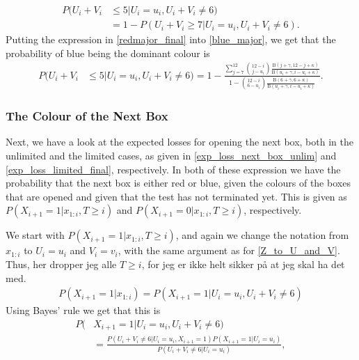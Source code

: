 \begin{equation}
\label{blue_major}
    \begin{aligned}
        P(U_i+V_i& \leq 5 | U_i=u_i,U_i+V_i \neq 6) \\
        &= 1 - P(U_i+V_i \geq 7 | U_i=u_i,U_i+V_i \neq 6).
    \end{aligned}
\end{equation}
Putting the expression in \eqref{redmajor_final} into \eqref{blue_major}, we get that the probability of blue being the dominant colour is
\begin{equation}
\label{blue_major_final}
    \begin{aligned}
        P(U_i+V_i& \leq 5 | U_i=u_i,U_i+V_i \neq 6) 
        = 1 - \frac{\sum_{j=7}^{12} \binom{12-i}{j-u_i} \frac{\text{B}(j+\gamma,12-j+\kappa)}{\text{B}(u_i+\gamma,i-u_i+\kappa)}}{1-\binom{12-i}{6-u_i} \frac{\text{B}(6+\gamma,6+\kappa)}{\text{B}(u_i+\gamma,i-u_i+\kappa)}}.
    \end{aligned}
\end{equation}

\subsubsection{The Colour of the Next Box}
Next, we have a look at the expected losses for opening the next box, both in the unlimited and the limited cases, as given in \eqref{exp_loss_next_box_unlim} and \eqref{exp_loss_limited_final}, respectively. In both of these expression we have the probability that the next box is either red or blue, given the colours of the boxes that are opened and given that the test has not terminated yet. This is given as $P(X_{i+1}=1|x_{1:i},T\geq i)$ and $P(X_{i+1}=0|x_{1:i},T\geq i)$, respectively.

We start with $P(X_{i+1}=1|x_{1:i},T\geq i)$, and again we change the notation from $x_{1:i}$ to $U_i=u_i$ and $V_i=v_i$, with the same argument as for \eqref{Z_to_U_and_V}. Thus,
her dropper jeg alle $T \geq i$, for jeg er ikke helt sikker på at jeg skal ha det med. 
\begin{equation}
    \begin{aligned}
        P(X_{i+1}=1|x_{1:i}) = P(X_{i+1}=1|U_i=u_i,U_i+V_i\neq6)
    \end{aligned}
\end{equation}
Using Bayes' rule we get that this is
\begin{equation}
\label{nextisred_bayes_rule}
    \begin{aligned}
        P(&X_{i+1}=1|U_i=u_i,U_i+V_i\neq6) \\[6pt]
        &= \frac{P(U_i+V_i\neq6|U_i=u_i,X_{i+1}=1)P(X_{i+1}=1|U_i=u_i)}
        {P(U_i+V_i\neq6|U_i=u_i)},
    \end{aligned}
\end{equation}

